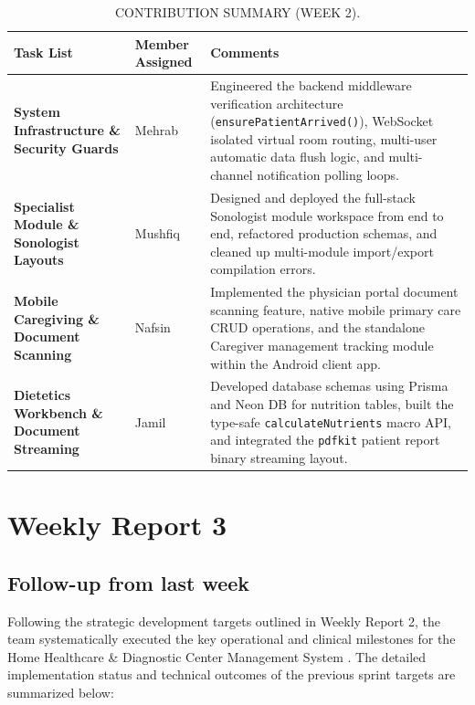 \documentclass[onecolumn,journal]{IEEEtran}
\begin{document}
	\begin{table}[H] 
		\centering
		\small
		\renewcommand{\arraystretch}{1.3}
		\begin{tabularx}{\textwidth}{>{\raggedright\arraybackslash}p{} >{\raggedright\arraybackslash}p{} >{\raggedright\arraybackslash}X}
			\toprule
			\textbf{Task List} & \textbf{Member Assigned} & \textbf{Comments} \\
			\midrule
			\textbf{System Infrastructure \& Security Guards} & Mehrab & Engineered the backend middleware verification architecture (\texttt{ensure\-Patient\-Arrived()}), WebSocket isolated virtual room routing, multi-user automatic data flush logic, and multi-channel notification polling loops. \\
			\textbf{Specialist Module \& Sonologist Layouts} & Mushfiq & Designed and deployed the full-stack Sonologist module workspace from end to end, refactored production schemas, and cleaned up multi-module import/export compilation errors. \\
			\textbf{Mobile Caregiving \& Document Scanning} & Nafsin & Implemented the physician portal document scanning feature, native mobile primary care CRUD operations, and the standalone Caregiver management tracking module within the Android client app. \\
			\textbf{Dietetics Workbench \& Document Streaming} & Jamil & Developed database schemas using Prisma and Neon DB for nutrition tables, built the type-safe \texttt{calculate\-Nutrients} macro API, and integrated the \texttt{pdfkit} patient report binary streaming layout. \\
			\bottomrule
		\end{tabularx}
		\vspace{8pt} 
		\caption{CONTRIBUTION SUMMARY (WEEK 2).}
		\label{tab:contribution_summary_w2}
	\end{table}
	
	\FloatBarrier
	\section{Weekly Report 3}
	
	\subsection{Follow-up from last week}
	
	Following the strategic development targets outlined in Weekly Report 2, the team systematically executed the key operational and clinical milestones for the Home Healthcare \& Diagnostic Center Management System \cite{srs2026}. The detailed implementation status and technical outcomes of the previous sprint targets are summarized below:
	
\end{document}
